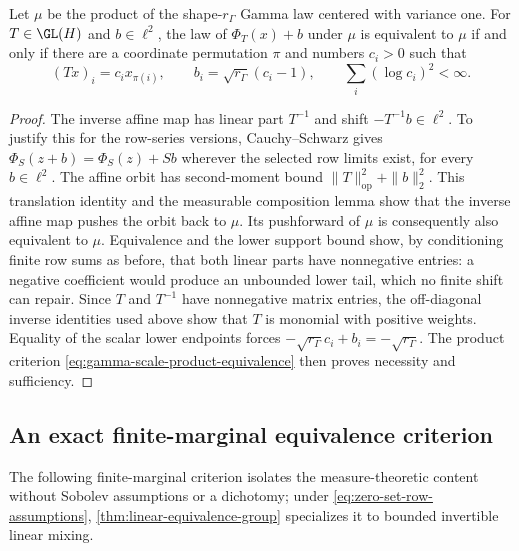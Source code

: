 \begin{corollary}
\label{cor:affine-gamma-classification}
Let \(\mu\) be the product of the shape-\(r_\Gamma\) Gamma law centered with
variance one.
For \(T\in\GL(H)\) and \(b\in\ell^2\), the law of
\(\Phi_T(x)+b\) under \(\mu\) is equivalent to \(\mu\) if and only if
there are a coordinate
permutation \(\pi\) and numbers \(c_i>0\) such that
\[
 (Tx)_i=c_ix_{\pi(i)},\qquad
 b_i=\sqrt{r_\Gamma}(c_i-1),\qquad
 \sum_i(\log c_i)^2<\infty.
\]
\end{corollary}
\begin{proof}
The inverse affine map has linear part \(T^{-1}\) and shift
\(-T^{-1}b\in\ell^2\).
To justify this for the row-series versions, Cauchy--Schwarz gives
\(\Phi_S(z+b)=\Phi_S(z)+Sb\) wherever the selected row limits exist,
for every \(b\in\ell^2\).
The affine orbit has second-moment bound
\(\|T\|_{\mathrm{op}}^2+\|b\|_2^2\).
This translation identity and the measurable composition lemma show
that the inverse affine map pushes the orbit back to \(\mu\).
Its pushforward of \(\mu\) is consequently also equivalent to \(\mu\).
Equivalence and the lower support bound show, by conditioning
finite row sums as before, that both linear parts have nonnegative
entries: a negative coefficient would produce an unbounded lower
tail, which no finite shift can repair.
Since \(T\) and \(T^{-1}\) have nonnegative matrix entries, the
off-diagonal inverse identities used above show that \(T\) is monomial
with positive weights.
Equality of the scalar lower endpoints forces
\(-\sqrt{r_\Gamma}c_i+b_i=-\sqrt{r_\Gamma}\).
The product criterion \eqref{eq:gamma-scale-product-equivalence}
then proves necessity and sufficiency.
\end{proof}

\subsection{An exact finite-marginal equivalence criterion}
\label{sec:finite-marginal-equivalence-criterion}

The following finite-marginal criterion isolates the measure-theoretic content
without Sobolev assumptions or a dichotomy; under
\eqref{eq:zero-set-row-assumptions}, \cref{thm:linear-equivalence-group}
specializes it to bounded invertible linear mixing.

